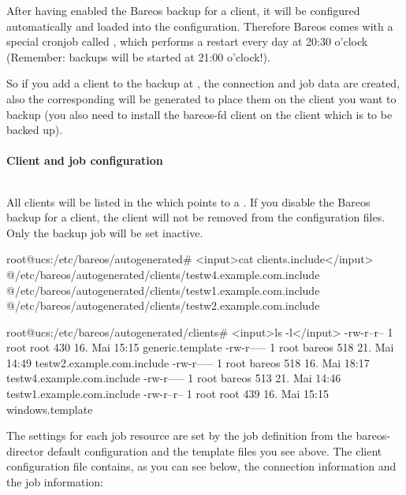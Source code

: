 After having enabled the Bareos backup for a client, it will be configured automatically and loaded into the configuration. Therefore Bareos comes with a special cronjob called , which performs a restart every day at 20:30 o'clock (Remember: backups will be started at 21:00 o'clock!).

So if you add a client to the backup at , the connection and job data are created, also the corresponding  will be generated to place them on the client you want to backup (you also need to install the bareos-fd client on the client which is to be backed up).

\paragraph{Client and job configuration}$\;$

All clients will be listed in the  which points to a . If you disable the Bareos backup for a client, the client will not be removed from the configuration files. Only the backup job will be set inactive.

\begin{commands}{}
root@ucs:/etc/bareos/autogenerated# <input>cat clients.include</input>
@/etc/bareos/autogenerated/clients/testw4.example.com.include
@/etc/bareos/autogenerated/clients/testw1.example.com.include
@/etc/bareos/autogenerated/clients/testw2.example.com.include
\end{commands}

\begin{commands}{}
root@ucs:/etc/bareos/autogenerated/clients# <input>ls -l</input>
-rw-r--r-- 1 root root 430 16. Mai 15:15 generic.template
-rw-r----- 1 root bareos 518 21. Mai 14:49 testw2.example.com.include
-rw-r----- 1 root bareos 518 16. Mai 18:17 testw4.example.com.include
-rw-r----- 1 root bareos 513 21. Mai 14:46 testw1.example.com.include
-rw-r--r-- 1 root root 439 16. Mai 15:15 windows.template
\end{commands}

The settings for each job resource are set by the job definition from the bareos-director default configuration and the template files you see above. The client configuration file contains, as you can see below, the connection information and the job information:


